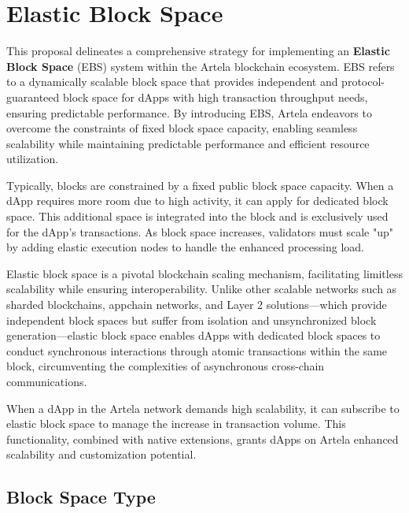 \section{Elastic Block Space}

This proposal delineates a comprehensive strategy for implementing an \textbf{Elastic Block Space} (EBS) system within the Artela blockchain ecosystem. EBS refers to a dynamically scalable block space that provides independent and protocol-guaranteed block space for dApps with high transaction throughput needs, ensuring predictable performance. By introducing EBS, Artela endeavors to overcome the constraints of fixed block space capacity, enabling seamless scalability while maintaining predictable performance and efficient resource utilization.

Typically, blocks are constrained by a fixed public block space capacity. When a dApp requires more room due to high activity, it can apply for dedicated block space. This additional space is integrated into the block and is exclusively used for the dApp’s transactions. As block space increases, validators must scale "up" by adding elastic execution nodes to handle the enhanced processing load.

Elastic block space is a pivotal blockchain scaling mechanism, facilitating limitless scalability while ensuring interoperability. Unlike other scalable networks such as sharded blockchains, appchain networks, and Layer 2 solutions—which provide independent block spaces but suffer from isolation and unsynchronized block generation—elastic block space enables dApps with dedicated block spaces to conduct synchronous interactions through atomic transactions within the same block, circumventing the complexities of asynchronous cross-chain communications.

When a dApp in the Artela network demands high scalability, it can subscribe to elastic block space to manage the increase in transaction volume. This functionality, combined with native extensions, grants dApps on Artela enhanced scalability and customization potential.

\subsection{Block Space Type}

